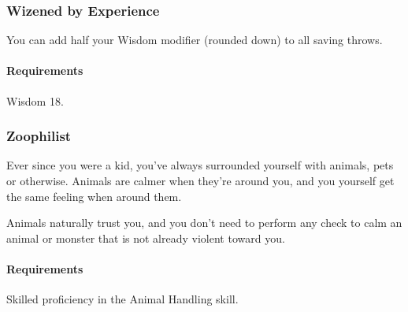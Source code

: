 \subsubsection{Wizened by Experience} \label{feat::wizenedbyexperience}
    You can add half your Wisdom modifier (rounded down) to all saving throws.
    \paragraph{Requirements} Wisdom 18.
\subsubsection{Zoophilist} \label{feat::zoophilist}
    Ever since you were a kid, you've always surrounded yourself with animals, pets or otherwise.
    Animals are calmer when they're around you, and you yourself get the same feeling when around them.

    Animals naturally trust you, and you don't need to perform any check to calm an animal or monster that is not already violent toward you.
    \paragraph{Requirements} Skilled proficiency in the Animal Handling skill.
